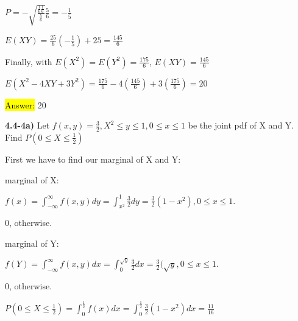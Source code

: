 \documentclass{article}
\begin{document}
\vspace{2mm}

$P=-\sqrt{\frac{\frac{1}{6} \frac{1}{6}}{\frac{5}{6}}}{\frac{5}{6}}=-\frac{1}{5}$

\vspace{2mm}


$E(XY)=\frac{25}{6}(-\frac{1}{5})+25=\frac{145}{6}$

\vspace{2mm}

Finally, with $E(X^{2})=E(Y^{2})=\frac{175}{6}$, $E(XY)=\frac{145}{6}$

\vspace{2mm}


$E(X^{2}-4XY+3Y^{2})=\frac{175}{6}-4(\frac{145}{6})+3(\frac{175}{6})=20$

\vspace{2mm}

\hl{Answer:} 20




\newpage
\textbf{4.4-4a)} Let $f(x,y)=\frac{3}{2} ,X^{2} \le y \le 1, 0 \le x \le 1$ be the joint pdf of X and Y. Find $P(0 \le X \le \frac{1}{2})$ 

\vspace{2mm}


First we have to find our marginal of X and Y:


\vspace{2mm}


marginal of X:

\vspace{2mm}
$f(x)=\int_{-\infty}^{\infty} f(x,y)dy=\int_{x^{2}}^{1} \frac{3}{2}dy=\frac{3}{2}(1-x^{2}), 0 \le x \le 1.$

\vspace{2mm}

0, otherwise.

\vspace{4mm}

marginal of Y:

\vspace{2mm}

$f(Y)=\int_{-\infty}^{\infty} f(x,y)dx=\int_{0}^{\sqrt{y}} \frac{3}{2}dx=\frac{3}{2}(\sqrt{y}, 0 \le x \le 1.$

\vspace{2mm}

0, otherwise.

\vspace{4mm}


$P(0 \le X \le \frac{1}{2})= \int_{0}^{\frac{1}{2}} f(x) dx=\int_{0}^{\frac{1}{2}} \frac{3}{2}(1-x^{2})dx=\frac{11}{16}$
\end{document}
